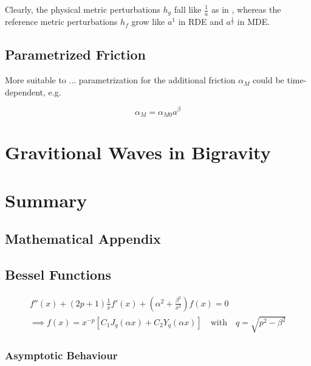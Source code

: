 \documentclass[parskip=half]{scrreprt}
\begin{document}
Clearly, the physical metric perturbations $h_g$ fall like $\frac{1}{a}$ as in \LambdaCDM, whereas the reference metric perturbations $h_f$ grow like $a^1$ in RDE and $a^\frac{1}{2}$ in MDE.


\section{Parametrized Friction}

More suitable to ... parametrization for the additional friction $\alpha_M$ could be time-dependent, e.g.

\begin{equation}
	\alpha_M = \alpha_{M0} a^\beta
\end{equation}



\chapter{Gravitional Waves in Bigravity}

\chapter{Summary}


\begin{appendices}

\chapter{Mathematical Appendix}

\section{Bessel Functions}

\begin{align}
	f''(x) + \left(2p+1\right)\frac{1}{x} f'(x) + \left(\alpha^2 + \frac{\beta^2}{x^2}\right) f(x) = 0 \\
	\implies f(x) = x^{-p} \left[C_1 J_q(\alpha x) + C_2 Y_q(\alpha x)\right] \quad \textrm{with} \quad q = \sqrt{p^2 - \beta^2}
\end{align}

\subsection{Asymptotic Behaviour}

\end{appendices}



\end{document}

